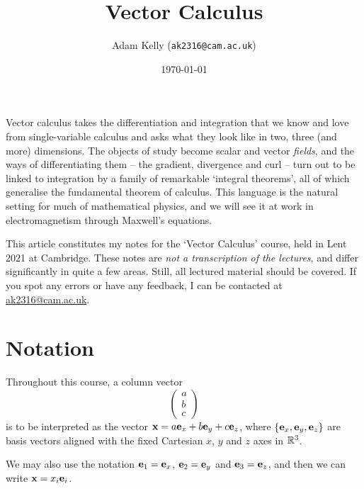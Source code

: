 \documentclass[a4paper]{scrartcl}
\title{Vector Calculus}
\author{Adam Kelly (\texttt{ak2316@cam.ac.uk})}
\date{\today}
\begin{document}
\maketitle

Vector calculus takes the differentiation and integration that we know and love from single-variable calculus and asks what they look like in two, three (and more) dimensions. The objects of study become scalar and vector \emph{fields}, and the ways of differentiating them -- the gradient, divergence and curl -- turn out to be linked to integration by a family of remarkable `integral theorems', all of which generalise the fundamental theorem of calculus. This language is the natural setting for much of mathematical physics, and we will see it at work in electromagnetism through Maxwell's equations.

This article constitutes my notes for the `Vector Calculus' course, held in Lent 2021 at Cambridge. These notes are \emph{not a transcription of the lectures}, and differ significantly in quite a few areas. Still, all lectured material should be covered. If you spot any errors or have any feedback, I can be contacted at \href{mailto:ak2316@cam.ac.uk}{ak2316@cam.ac.uk}.

\tableofcontents

\section{Notation}


Throughout this course, a column vector
$$
\begin{pmatrix}
a \\ b\\ c
\end{pmatrix}
$$
is to be interpreted as the vector $\mathbf{x} = a \mathbf{e}_x + b \mathbf{e}_y + c\mathbf{e}_z$, where $\{\mathbf{e}_x, \mathbf{e}_y, \mathbf{e}_z\}$ are basis vectors aligned with the fixed Cartesian $x$, $y$ and $z$ axes in $\mathbb{R}^3$.

\begin{center}
\end{center}

We may also use the notation $\mathbf{e}_1 = \mathbf{e}_x$, $\mathbf{e}_2 = \mathbf{e}_y$ and $\mathbf{e}_3 = \mathbf{e}_z$, and then we can write $\mathbf{x} = x_i \mathbf{e}_i$.
\end{document}
